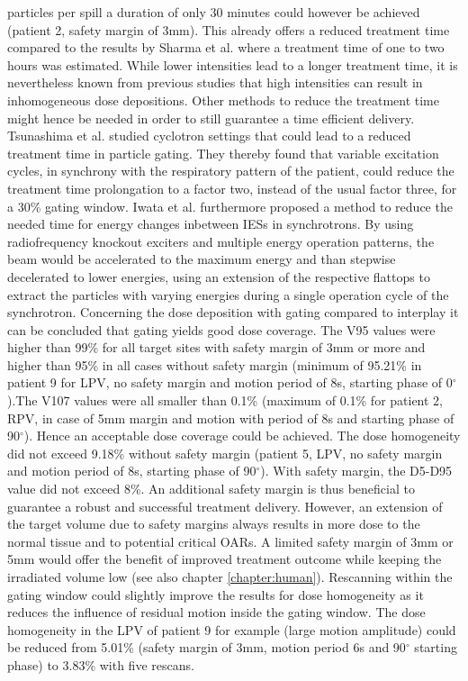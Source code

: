 \documentclass[type=dr, dr=rernat, accentcolor=tud7b,colorbacktitle, bigchapter, openright, twoside, 12pt ]{tudthesis}
\begin{document}
particles per spill a duration of only 30 minutes could however be achieved (patient 2, safety margin of 3mm). This already offers a reduced 
treatment time compared to the results by Sharma et al. where a treatment time of one to two hours was estimated. 
While lower intensities lead to a longer treatment time, it is nevertheless known from previous studies \cite{Mue14} that high intensities 
can result in inhomogeneous dose depositions. Other methods to reduce the treatment time might hence be needed in order to still guarantee a time 
efficient delivery. Tsunashima et al. \cite{Tsu08} studied cyclotron settings that could lead to a reduced treatment time in particle gating. 
They thereby found that variable excitation cycles, in synchrony with the respiratory pattern of the patient, could reduce the treatment time 
prolongation to a factor two, instead of the usual factor three, for a 30\% gating window. 
Iwata et al. \cite{Iwa10} furthermore proposed a method to reduce the needed time for energy changes inbetween IESs in synchrotrons. 
By using radiofrequency knockout exciters and multiple energy operation patterns, the beam would be accelerated to the maximum energy and than 
stepwise decelerated to lower energies, using an extension of the respective flattops to extract the particles with varying energies during a 
single operation cycle of the synchrotron.\newline
\newline
Concerning the dose deposition with gating compared to interplay it can be concluded that gating yields good dose coverage. The V95 values 
were higher than 99\% for all target sites with safety margin of 3mm or more and higher than 95\% in all cases without safety margin (minimum of 
95.21\% in patient 9 for LPV, no safety margin and motion period of 8s, starting phase of 0$^{\circ}$).The V107 values were all smaller 
than 0.1\% (maximum of 0.1\% for patient 2, RPV, in case of 5mm margin and motion with period of 8s and starting phase of 90$^{\circ}$). 
Hence an acceptable dose coverage could be achieved. The dose homogeneity did not exceed 9.18\% without safety margin (patient 5, LPV, no 
safety margin and motion period of 8s, starting phase of 90$^{\circ}$). With safety margin, the D5-D95 value did not exceed 8\%. An additional 
safety margin is thus beneficial to guarantee a robust and successful treatment delivery. However, an extension of the target volume due to 
safety margins always results in more dose to the normal tissue and to potential critical OARs. A limited safety margin of 3mm or 5mm would 
offer the benefit of improved treatment outcome while keeping the irradiated volume low (see also chapter \ref{chapter:human}).\newline
\newline
Rescanning within the gating window could slightly improve the results for dose homogeneity as it reduces the influence of residual motion 
inside the gating window. The dose homogeneity in the LPV of patient 9 for example (large motion amplitude) could be reduced from 5.01\%  
(safety margin of 3mm, motion period 6s and 90$^{\circ}$ starting phase) to 3.83\% with five rescans. 
\end{document}
